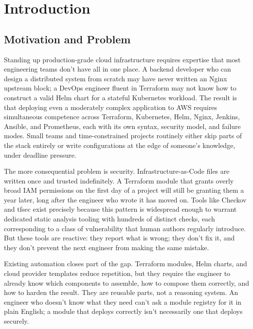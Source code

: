 \chapter{Introduction}
\label{ch:introduction}

\section{Motivation and Problem}
\label{sec:motivation}

Standing up production-grade cloud infrastructure requires expertise that
most engineering teams don't have all in one place. A backend developer
who can design a distributed system from scratch may have never written an
Nginx upstream block; a DevOps engineer fluent in Terraform may not know
how to construct a valid Helm chart for a stateful Kubernetes workload.
The result is that deploying even a moderately complex application to AWS
requires simultaneous competence across Terraform, Kubernetes, Helm, Nginx,
Jenkins, Ansible, and Prometheus, each with its own syntax, security model,
and failure modes. Small teams and time-constrained projects routinely
either skip parts of the stack entirely or write configurations at the edge
of someone's knowledge, under deadline pressure.

The more consequential problem is security. Infrastructure-as-Code files
are written once and trusted indefinitely. A Terraform module that grants
overly broad IAM permissions on the first day of a project will still be
granting them a year later, long after the engineer who wrote it has moved
on. Tools like Checkov and tfsec exist precisely because this pattern is
widespread enough to warrant dedicated static analysis tooling with hundreds
of distinct checks, each corresponding to a class of vulnerability that human
authors regularly introduce. But these tools are reactive: they report what
is wrong; they don't fix it, and they don't prevent the next engineer from
making the same mistake.

Existing automation closes part of the gap. Terraform modules, Helm charts,
and cloud provider templates reduce repetition, but they require the engineer
to already know which components to assemble, how to compose them correctly,
and how to harden the result. They are reusable parts, not a reasoning
system. An engineer who doesn't know what they need can't ask a module
registry for it in plain English; a module that deploys correctly isn't
necessarily one that deploys securely.

